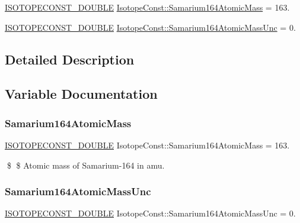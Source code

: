 \begin{DoxyCompactItemize}
\item 
\mbox{\hyperlink{group___isotope_const-_macros_ga8f45a7272ce02c0b4c65c44636ed719a}{I\+S\+O\+T\+O\+P\+E\+C\+O\+N\+S\+T\+\_\+\+D\+O\+U\+B\+LE}} \mbox{\hyperlink{group___isotope_const-_samarium-_sm164_ga3cfd5ddda7501b11c1dd0648f738f265}{Isotope\+Const\+::\+Samarium164\+Atomic\+Mass}} = 163.
\item 
\mbox{\hyperlink{group___isotope_const-_macros_ga8f45a7272ce02c0b4c65c44636ed719a}{I\+S\+O\+T\+O\+P\+E\+C\+O\+N\+S\+T\+\_\+\+D\+O\+U\+B\+LE}} \mbox{\hyperlink{group___isotope_const-_samarium-_sm164_ga0ec3e777d0b250dbfa6692b69b27e32f}{Isotope\+Const\+::\+Samarium164\+Atomic\+Mass\+Unc}} = 0.
\end{DoxyCompactItemize}


\subsection{Detailed Description}


\subsection{Variable Documentation}
\mbox{\label{group___isotope_const-_samarium-_sm164_ga3cfd5ddda7501b11c1dd0648f738f265}} 
\subsubsection{\texorpdfstring{Samarium164\+Atomic\+Mass}{Samarium164AtomicMass}}
{\footnotesize\ttfamily \mbox{\hyperlink{group___isotope_const-_macros_ga8f45a7272ce02c0b4c65c44636ed719a}{I\+S\+O\+T\+O\+P\+E\+C\+O\+N\+S\+T\+\_\+\+D\+O\+U\+B\+LE}} Isotope\+Const\+::\+Samarium164\+Atomic\+Mass = 163.}

\$ \$ Atomic mass of Samarium-\/164 in amu. \mbox{\label{group___isotope_const-_samarium-_sm164_ga0ec3e777d0b250dbfa6692b69b27e32f}} 
\subsubsection{\texorpdfstring{Samarium164\+Atomic\+Mass\+Unc}{Samarium164AtomicMassUnc}}
{\footnotesize\ttfamily \mbox{\hyperlink{group___isotope_const-_macros_ga8f45a7272ce02c0b4c65c44636ed719a}{I\+S\+O\+T\+O\+P\+E\+C\+O\+N\+S\+T\+\_\+\+D\+O\+U\+B\+LE}} Isotope\+Const\+::\+Samarium164\+Atomic\+Mass\+Unc = 0.}

